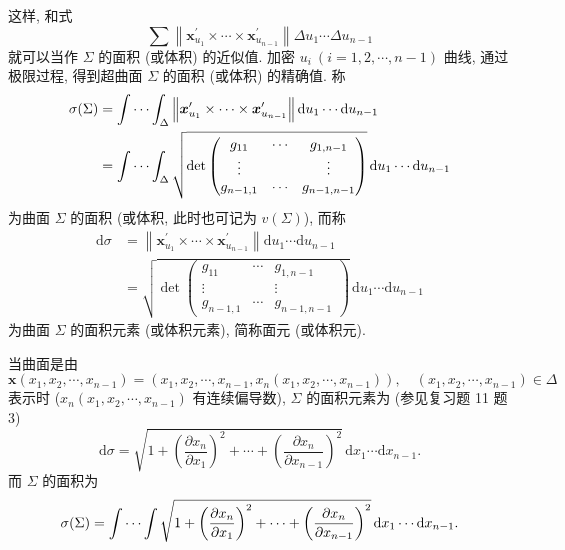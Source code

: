 \begin{definition}
这样, 和式
\[
  \sum\left\|\boldsymbol{x}_{u_{1}}^{\prime} \times \cdots \times \boldsymbol{x}_{u_{n-1}}^{\prime}\right\| \Delta u_{1} \cdots \Delta u_{n-1}
\]
就可以当作 $\Sigma$ 的面积 (或体积) 的近似值. 加密 $u_{i}\ (i=1,2, \cdots, n-1)$ 曲线, 通过极限过程, 得到超曲面 $\Sigma$ 的面积 (或体积) 的精确值. 称
\begin{align*}
  \sigma(\Sigma) &=\idotsint_{\Delta}\left\|\boldsymbol{x}_{u_{1}}^{\prime} \times \cdots \times \boldsymbol{x}_{u_{n-1}}^{\prime}\right\| \mathrm{d} u_{1} \cdots \mathrm{d} u_{n-1} \\
  &=\idotsint_{\Delta} \sqrt{\operatorname{det}\begin{pmatrix}
      g_{11} & \cdots & g_{1, n-1} \\
      \vdots & & \vdots \\
      g_{n-1,1} & \cdots & g_{n-1, n-1}
    \end{pmatrix}}\,\mathrm{d} u_{1} \cdots \mathrm{d} u_{n-1}
\end{align*}
为曲面 $\Sigma$ 的面积 (或体积, 此时也可记为 $v(\Sigma)$), 而称
\begin{align*}
  \mathrm{d} \sigma &=\left\|\boldsymbol{x}_{u_{1}}^{\prime} \times \cdots \times \boldsymbol{x}_{u_{n-1}}^{\prime}\right\| \mathrm{d} u_{1} \cdots \mathrm{d} u_{n-1} \\
  &=\sqrt{\operatorname{det}\begin{pmatrix}
      g_{11} & \cdots & g_{1, n-1} \\
      \vdots & & \vdots \\
      g_{n-1,1} & \cdots & g_{n-1, n-1}
    \end{pmatrix}}\,\mathrm{d} u_{1} \cdots \mathrm{d} u_{n-1}
\end{align*}
为曲面 $\Sigma$ 的面积元素 (或体积元素), 简称面元 (或体积元).

当曲面是由
\[
  \boldsymbol{x}\left(x_{1}, x_{2}, \cdots, x_{n-1}\right)=\left(x_{1}, x_{2}, \cdots, x_{n-1}, x_{n}\left(x_{1}, x_{2}, \cdots, x_{n-1}\right)\right), \quad\left(x_{1}, x_{2}, \cdots, x_{n-1}\right) \in \Delta
\]
表示时 ($x_{n}\left(x_{1}, x_{2}, \cdots, x_{n-1}\right)$ 有连续偏导数), $\Sigma$ 的面积元素为 (参见复习题 11 题 3)
\[
  \mathrm{d} \sigma=\sqrt{1+\left(\frac{\partial x_{n}}{\partial x_{1}}\right)^{2}+\cdots+\left(\frac{\partial x_{n}}{\partial x_{n-1}}\right)^{2}}\,\mathrm{d} x_{1} \cdots \mathrm{d} x_{n-1}.
\]
而 $\Sigma$ 的面积为
\[
  \sigma(\Sigma)=\idotsint \sqrt{1+\left(\frac{\partial x_{n}}{\partial x_{1}}\right)^{2}+\cdots+\left(\frac{\partial x_{n}}{\partial x_{n-1}}\right)^{2}}\,\mathrm{d} x_{1} \cdots \mathrm{d} x_{n-1}.
\]


\end{definition}
